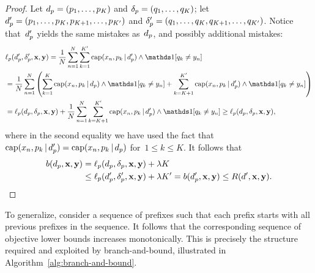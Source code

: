 \begin{arxiv}
\begin{proof}
Let ${d_p = (p_1, \dots, p_K)}$ and ${\delta_p = (q_1, \dots, q_K)}$;
let ${d_p' = (p_1, \dots, p_K, p_{K+1}, \dots, p_{K'})}$
and ${\delta_p' = (q_1, \dots, q_K, q_{K+1}, \dots, q_{K'})}$.
%
Notice that~$d_p'$ yields the same mistakes as~$d_p$,
and possibly additional mistakes:
\begin{align}
&\Loss_p(\Prefix', \Labels', \x, \y)
= \frac{1}{N} \sum_{n=1}^N  \sum_{k=1}^{K'} \Cap(x_n, p_k \given \Prefix') \wedge \one [ q_k \neq y_n ] \nn \\
&= \frac{1}{N} \sum_{n=1}^N \left( \sum_{k=1}^K \Cap(x_n, p_k \given \Prefix) \wedge \one [ q_k \neq y_n ]
+ \sum_{k=K+1}^{K'} \Cap(x_n, p_k \given \Prefix') \wedge \one [ q_k \neq y_n ] \right) \nn \\
&=\Loss_p(\Prefix, \Labels, \x, \y)
+ \frac{1}{N} \sum_{n=1}^N \sum_{k=K+1}^{K'} \Cap(x_n, p_k \given \Prefix') \wedge \one [ q_k \neq y_n ]
\ge \Loss_p(\Prefix, \Labels, \x, \y),
\label{eq:prefix-loss}
\end{align}
where in the second equality we have used the fact that
${\textnormal{cap}(x_n, p_k \,|\, d_p') = \textnormal{cap}(x_n, p_k \,|\, d_p)}$
for~${1 \le k \le K}$.
%
It follows that
\begin{align}
b(d_p, \mathbf{x}, \mathbf{y}) &= \ell_p(d_p, \delta_p, \mathbf{x}, \mathbf{y}) + {\lambda} K \nonumber \\
&\le  \ell_p(d_p', \delta_p', \mathbf{x}, \mathbf{y}) + {\lambda} K' = b(d_p', \mathbf{x}, \mathbf{y})
\le R({d}', \mathbf{x}, \mathbf{y}).
\label{eq:prefix-lb}
\end{align}
\end{proof}
\end{arxiv}

To generalize, consider a sequence of prefixes such that each prefix
starts with all previous prefixes in the sequence.
%
It follows that the corresponding sequence of objective lower bounds
increases monotonically.
%
This is precisely the structure required and exploited by branch-and-bound,
illustrated in Algorithm~\ref{alg:branch-and-bound}.


